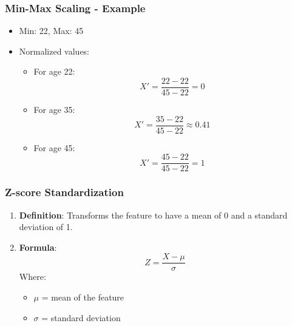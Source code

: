 \documentclass[aspectratio=169]{beamer}
\begin{document}
\begin{frame}
    \frametitle{Min-Max Scaling - Example}
    \begin{itemize}
        \item Min: 22, Max: 45
        \item Normalized values:
        \begin{itemize}
            \item For age 22: 
            \begin{equation}
                X' = \frac{22 - 22}{45 - 22} = 0
            \end{equation}
            \item For age 35: 
            \begin{equation}
                X' = \frac{35 - 22}{45 - 22} \approx 0.41
            \end{equation}
            \item For age 45: 
            \begin{equation}
                X' = \frac{45 - 22}{45 - 22} = 1
            \end{equation}
        \end{itemize}
    \end{itemize}
\end{frame}

\begin{frame}
    \frametitle{Z-score Standardization}
    \begin{enumerate}
        \item \textbf{Definition}: Transforms the feature to have a mean of 0 and a standard deviation of 1.
        \item \textbf{Formula}:
        \begin{equation}
            Z = \frac{X - \mu}{\sigma}
        \end{equation}
        Where:
        \begin{itemize}
            \item $\mu$ = mean of the feature
            \item $\sigma$ = standard deviation
        \end{itemize}
    \end{enumerate}
\end{frame}
\end{document}

